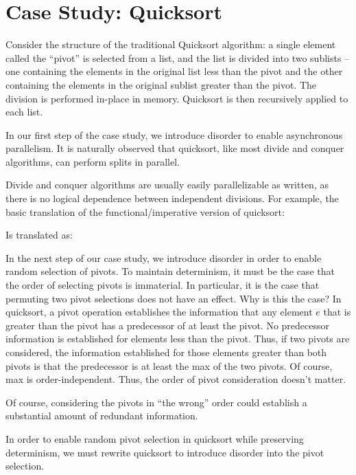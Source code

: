 \section{Case Study: Quicksort}
\label{sec:qscs}

Consider the structure of the traditional Quicksort algorithm: a single element called the “pivot” is selected from a list, and the list is divided into two sublists -- one containing the elements in the original list less than the pivot and the other containing the elements in the original sublist greater than the pivot.  The division is performed in-place in memory.  Quicksort is then recursively applied to each list.

In our first step of the case study, we introduce disorder to enable asynchronous parallelism.  It is naturally observed that quicksort, like most divide and conquer algorithms, can perform splits in parallel.

Divide and conquer algorithms are usually easily parallelizable as written, as there is no logical dependence between independent divisions.  For example, the basic translation of the functional/imperative version of quicksort:


Is translated as:


In the next step of our case study, we introduce disorder in order to enable random selection of pivots.  To maintain determinism, it must be the case that the order of selecting pivots is immaterial.  In particular, it is the case that permuting two pivot selections does not have an effect.  Why is this the case?  In quicksort, a pivot operation establishes the information that any element $e$ that is greater than the pivot has a predecessor of at least the pivot.  No predecessor information is established for elements less than the pivot.  Thus, if two pivots are considered, the information established for those elements greater than both pivots is that the predecessor is at least the max of the two pivots.  Of course, max is order-independent.  Thus, the order of pivot consideration doesn’t matter.

Of course, considering the pivots in “the wrong” order could establish a substantial amount of redundant information.

In order to enable random pivot selection in quicksort while preserving determinism, we must rewrite quicksort to introduce disorder into the pivot selection.

